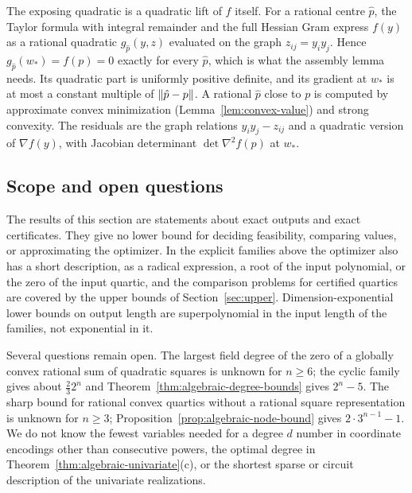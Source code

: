The exposing quadratic is a quadratic lift of $f$ itself. For a rational
centre $\hat p$, the Taylor formula with integral remainder and the full
Hessian Gram express $f(y)$ as a rational quadratic $g_{\hat p}(y,z)$
evaluated on the graph $z_{ij}=y_iy_j$. Hence $g_{\hat p}(w_*)=f(p)=0$
exactly for every $\hat p$, which is what the assembly lemma needs. Its
quadratic part is uniformly positive definite, and its gradient at $w_*$ is
at most a constant
multiple of $\left\lVert\hat p-p\right\rVert$. A rational
$\hat p$ close to $p$ is computed by approximate convex minimization
(Lemma~\ref{lem:convex-value}) and strong convexity. The residuals are the
graph relations $y_iy_j-z_{ij}$ and a quadratic version of $\nabla f(y)$, with
Jacobian determinant $\det\nabla^2f(p)$ at $w_*$.

\subsection{Scope and open questions}
\label{sec:algebraic-scope}

The results of this section are statements about exact outputs and exact
certificates. They give no lower bound for deciding feasibility, comparing
values, or approximating the optimizer. In the explicit families above the
optimizer also has a short description, as a radical expression, a root of
the input polynomial, or the zero of the input quartic, and the comparison
problems for certified quartics are covered by the upper bounds of
Section~\ref{sec:upper}. Dimension-exponential
lower bounds on output length are superpolynomial in the input length of the
families, not exponential in it.

Several questions remain open. The largest field degree of the zero of a
globally convex rational sum of quadratic squares is unknown for $n\ge6$;
the cyclic family gives about $\tfrac232^n$ and
Theorem~\ref{thm:algebraic-degree-bounds} gives $2^n-5$. The sharp bound for
rational convex quartics without a rational square representation is unknown
for $n\ge3$; Proposition~\ref{prop:algebraic-node-bound} gives
$2\cdot3^{n-1}-1$. We do not know the fewest variables needed for a degree $d$
number in coordinate encodings other than consecutive powers, the optimal
degree in Theorem~\ref{thm:algebraic-univariate}(c), or the shortest sparse
or circuit description of the univariate realizations.
